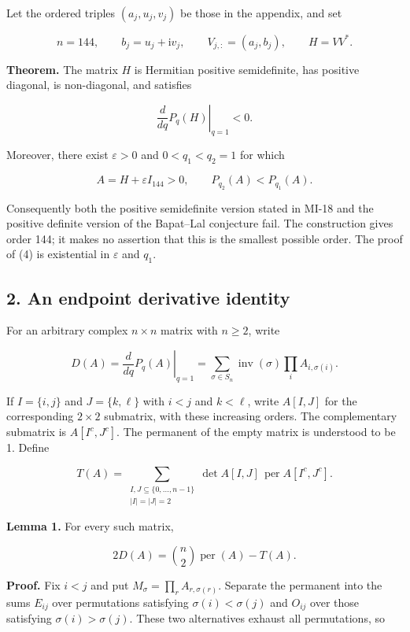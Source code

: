 \documentclass[10pt,a4paper]{article}
\begin{document}
Let the ordered triples \((a_j,u_j,v_j)\) be those in the appendix, and
set

\nopagebreak[4]
\[
n=144,\qquad b_j=u_j+\mathrm{i}v_j,\qquad
V_{j,:}=(a_j,b_j),\qquad H=VV^*.
\tag{2}
\]

\textbf{Theorem.} The matrix \(H\) is Hermitian positive semidefinite,
has positive diagonal, is non-diagonal, and satisfies

\nopagebreak[4]
\[
\left.\frac{d}{dq}P_q(H)\right|_{q=1}<0.
\tag{3}
\]

Moreover, there exist \(\varepsilon>0\) and \(0<q_1<q_2=1\) for which

\nopagebreak[4]
\[
A=H+\varepsilon I_{144}>0,
\qquad P_{q_2}(A)<P_{q_1}(A).
\tag{4}
\]

Consequently both the positive semidefinite version stated in MI-18 and
the positive definite version of the Bapat--Lal conjecture fail. The
construction gives order 144; it makes no assertion that this is the
smallest possible order. The proof of (4) is existential in
\(\varepsilon\) and \(q_1\).

\subsection{2. An endpoint derivative
identity}\label{an-endpoint-derivative-identity}

For an arbitrary complex \(n\times n\) matrix with \(n\ge2\), write

\nopagebreak[4]
\[
D(A)=\left.\frac{d}{dq}P_q(A)\right|_{q=1}
=\sum_{\sigma\in S_n}\operatorname{inv}(\sigma)
                         \prod_i A_{i,\sigma(i)}.
\]

If \(I=\{i,j\}\) and \(J=\{k,\ell\}\) with \(i<j\) and \(k<\ell\), write
\(A[I,J]\) for the corresponding \(2\times2\) submatrix, with these
increasing orders. The complementary submatrix is \(A[I^c,J^c]\). The
permanent of the empty matrix is understood to be 1. Define

\nopagebreak[4]
\[
T(A)=\sum_{\substack{I,J\subseteq\{0,\ldots,n-1\}\\|I|=|J|=2}}
       \det A[I,J]\,\operatorname{per}A[I^c,J^c].
\]

\textbf{Lemma 1.} For every such matrix,

\nopagebreak[4]
\[
2D(A)=\binom n2\operatorname{per}(A)-T(A).
\tag{5}
\]

\textbf{Proof.} Fix \(i<j\) and put
\(M_\sigma=\prod_r A_{r,\sigma(r)}\). Separate the permanent into the
sums \(E_{ij}\) over permutations satisfying \(\sigma(i)<\sigma(j)\) and
\(O_{ij}\) over those satisfying \(\sigma(i)>\sigma(j)\). These two
alternatives exhaust all permutations, so
\end{document}
